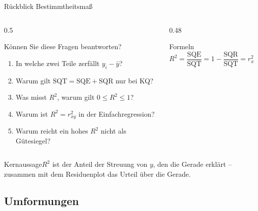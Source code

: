 \documentclass[aspectratio=169,11pt]{beamer}
\newcommand{\kernaussage}[1]{\begin{alertblock}{Kernaussage}#1\end{alertblock}}
\begin{document}
\begin{frame}{Rückblick Bestimmtheitsmaß}
  \small
  \begin{columns}[T]
    \begin{column}{0.5\textwidth}
      \begin{block}{Können Sie diese Fragen beantworten?}
        \begin{enumerate}
          \setlength{\itemsep}{1pt}
          \item In welche zwei Teile zerfällt $y_i - \bar{y}$?
          \item Warum gilt $\text{SQT} = \text{SQE} + \text{SQR}$ nur bei KQ?
          \item Was misst $R^{2}$, warum gilt $0 \le R^{2} \le 1$?
          \item Warum ist $R^{2} = r_{xy}^{2}$ in der Einfachregression?
          \item Warum reicht ein hohes $R^{2}$ nicht als Gütesiegel?
        \end{enumerate}
      \end{block}
    \end{column}
    \begin{column}{0.48\textwidth}
      \begin{block}{Formeln}
        \vspace{-6pt}
        \[
          R^{2} = \frac{\text{SQE}}{\text{SQT}} = 1 - \frac{\text{SQR}}{\text{SQT}} = r_{xy}^{2}
        \]
      \end{block}
    \end{column}
  \end{columns}

  \kernaussage{$R^{2}$ ist der Anteil der Streuung von $y$, den die Gerade erklärt --
    zusammen mit dem Residuenplot das Urteil über die Gerade.}
\end{frame}

\subsection{Umformungen}
\end{document}
